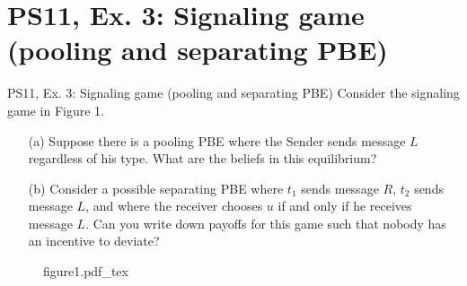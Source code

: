 \section{PS11, Ex. 3: Signaling game (pooling and separating PBE)}

\begin{frame}{PS11, Ex. 3: Signaling game (pooling and separating PBE)}
    Consider the signaling game in Figure 1.
    \begin{itemize}
      \item[(a)] Suppose there is a pooling PBE where the Sender sends message $L$ regardless of his type. What are the beliefs in this equilibrium?
      \item[(b)] Consider a possible separating PBE where $t_1$ sends message $R$, $t_2$ sends message $L$, and where the receiver chooses $u$ if and only if he receives message $L$. Can you write down payoffs for this game such that nobody has an incentive to deviate?
    \end{itemize} \vspace{-8pt}
    \begin{multicols}{2}
      \vfill\null\columnbreak
      \begin{figure}[!h]
        \center\def\svgwidth{\columnwidth}
        {figure1.pdf_tex}
      \end{figure}
      \vfill\null \columnbreak
      \vfill
    \end{multicols}
\end{frame}


